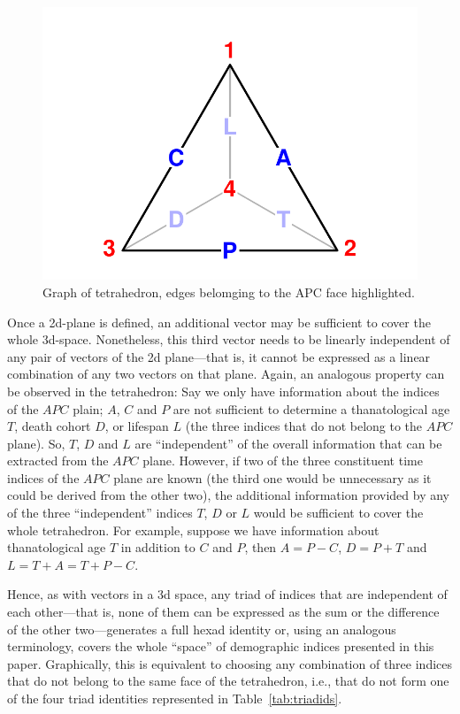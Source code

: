 \documentclass[11pt,oneside,a4paper]{article} %
\begin{document}
\begin{figure}[h!]
\centering
\caption{Graph of tetrahedron, edges belomging to the APC face highlighted.}
\label{fig:tet4vert1}
\includegraphics[scale=1]{Figures/tet4vert1New.pdf}
\end{figure}
\noindent 

Once a 2d-plane is defined, an additional vector may be sufficient to cover the
whole 3d-space. Nonetheless, this third vector needs to be linearly independent
of any pair of vectors of the 2d plane---that is, it cannot be expressed as a
linear combination of any two vectors on that plane. Again, an analogous
property can be observed in the tetrahedron: Say we only have information about the indices of the $APC$ plain; $A$, $C$ and $P$ are not sufficient to determine a thanatological age $T$, death cohort $D$, or lifespan $L$ (the three indices that do not belong to the $APC$ plane). So, $T$, $D$ and $L$ are ``independent'' of the overall information that can be extracted from the $APC$ plane. However, if two of the three constituent time indices of the $APC$ plane are known (the third one would be unnecessary as it could be derived from the other two), the additional information provided by any of the three ``independent'' indices $T$, $D$ or $L$ would be sufficient to cover the whole tetrahedron. For example, suppose we have information about thanatological age $T$ in addition to $C$ and $P$, then
$A=P-C$, $D=P+T$ and $L=T+A=T+P-C$. 

Hence, as with vectors in a 3d space, any
triad of indices that are independent of each other---that is, none of them can
be expressed as the sum or the difference of the other two---generates a full
hexad identity or, using an analogous terminology, covers the whole ``space'' of
demographic indices presented in this paper. Graphically, this is equivalent to
choosing any combination of three indices that do not belong to the same face
of the tetrahedron, i.e., that do not form one of the four triad identities
represented in Table~\ref{tab:triadids}.
\end{document}
